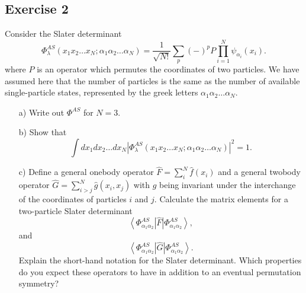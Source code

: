 \documentclass[prc]{revtex4}
\newcommand{\bra}[1]{\left\langle #1 \right|}
\newcommand{\ket}[1]{\left| #1 \right\rangle}
\begin{document}
\subsection*{Exercise 2}
Consider the Slater determinant
\[
\Phi_{\lambda}^{AS}(x_{1}x_{2}\dots x_{N};\alpha_{1}\alpha_{2}\dots\alpha_{N})
=\frac{1}{\sqrt{N!}}\sum_{p}(-)^{p}P\prod_{i=1}^{N}\psi_{\alpha_{i}}(x_{i}).
\]
where $P$ is an operator which permutes the coordinates of two particles. We have assumed here that the 
number of particles is the same as the number of available single-particle states, represented by the
greek letters $\alpha_{1}\alpha_{2}\dots\alpha_{N}$.
\begin{enumerate}
\item[a)] Write  out $\Phi^{AS}$ for $N=3$.  
\item[b)] Show that
\[
\int dx_{1}dx_{2}\dots dx_{N}\left\vert
\Phi_{\lambda}^{AS}(x_{1}x_{2}\dots x_{N};\alpha_{1}\alpha_{2}\dots\alpha_{N})
\right\vert^{2} = 1.
\]
\item[c)] Define a general onebody operator $\hat{F} = \sum_{i}^N\hat{f}(x_{i})$ and a general 
twobody operator $\hat{G}=\sum_{i>j}^N\hat{g}(x_{i},x_{j})$
with $g$ being invariant under the interchange of the coordinates of particles $i$ and $j$.
Calculate the matrix elements for a two-particle Slater determinant
\[
\bra{\Phi_{\alpha_{1}\alpha_{2}}^{AS}}\hat{F}\ket{\Phi_{\alpha_{1}\alpha_{2}}^{AS}},
\]
and
\[
\bra{\Phi_{\alpha_{1}\alpha_{2}}^{AS}}\hat{G}\ket{\Phi_{\alpha_{1}\alpha_{2}}^{AS}}.
\]
Explain the short-hand notation for the Slater determinant.
Which properties do you expect these operators to have in addition to an eventual permutation
symmetry?
\end{enumerate}
\end{document}
